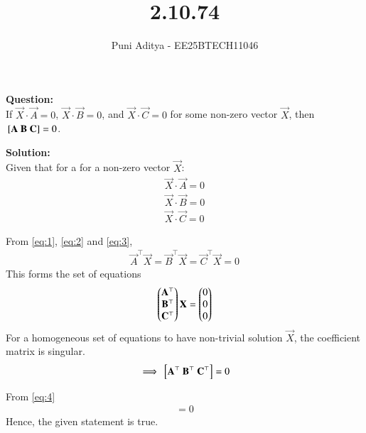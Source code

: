 \documentclass[journal]{IEEEtran}
\begin{document}
\title{2.10.74}
\author{Puni Aditya - EE25BTECH11046}
\maketitle

\textbf{Question:}\\
If $\vec{X} \cdot \vec{A} = 0$, $\vec{X} \cdot \vec{B} = 0$, and $\vec{X} \cdot \vec{C} = 0$ for some non-zero vector $\vec{X}$, then ${}\left[\mathbf{A}\ \mathbf{B}\ \mathbf{C}\right] = 0$.

\textbf{Solution:}\\
Given that for a for a non-zero vector $\vec{X}$:
\begin{align}
    \vec{X} \cdot \vec{A} = 0 \label{eq:1} \\
    \vec{X} \cdot \vec{B} = 0 \label{eq:2} \\
    \vec{X} \cdot \vec{C} = 0 \label{eq:3}
\end{align}

From \eqref{eq:1}, \eqref{eq:2} and \eqref{eq:3},
\begin{align}
    \vec{A}^\top \vec{X} = \vec{B}^\top \vec{X} = \vec{C}^\top \vec{X} = 0
\end{align}
This forms the set of equations
\begin{align}
    \begin{pmatrix}\mathbf{A}^\top \\ \mathbf{B}^\top \\ \mathbf{C}^\top\end{pmatrix} \mathbf{X} = \begin{pmatrix}0 \\ 0 \\ 0\end{pmatrix}
\end{align}
For a homogeneous set of equations to have non-trivial solution $\vec{X}$, the coefficient matrix is singular.
\begin{align}
    \implies {}\left[\mathbf{A}^\top\ \mathbf{B}^\top\ \mathbf{C}^\top\right] = 0 \label{eq:4}
\end{align}

From \eqref{eq:4}
\begin{align}
    [\vec{A}\ \vec{B}\ \vec{C}] = 0
\end{align}
Hence, the given statement is true. \\
\end{document}
